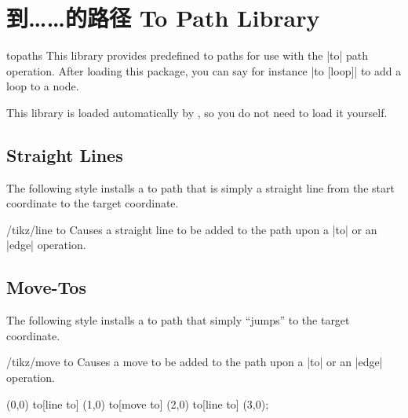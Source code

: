 %
%
%


\section{到……的路径 To Path Library}
\label{library-to-paths}

\begin{tikzlibrary}{topaths}
    This library provides predefined to paths for use with the |to| path
    operation. After loading this package, you can say for instance |to [loop]|
    to add a loop to a node.

    This library is loaded automatically by \tikzname, so you do not need to
    load it yourself.
\end{tikzlibrary}


\subsection{Straight Lines}

The following style installs a to path that is simply a straight line from the
start coordinate to the target coordinate.

\begin{key}{/tikz/line to}
    Causes a straight line to be added to the path upon a |to| or an |edge|
    operation.
\begin{codeexample}[]
\end{codeexample}
\end{key}


\subsection{Move-Tos}

The following style installs a to path that simply ``jumps'' to the target
coordinate.

\begin{key}{/tikz/move to}
    Causes a move to be added to the path upon a |to| or an |edge| operation.
\begin{codeexample}[]
\tikz \draw (0,0) to[line to] (1,0)
                  to[move to] (2,0) to[line to] (3,0);
\end{codeexample}
\end{key}


